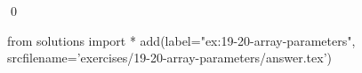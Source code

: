 
\begin{ex}
  \label{ex:19-20-array-parameters}
  
  \qed
\end{ex}
\begin{python0}
from solutions import *
add(label="ex:19-20-array-parameters",
    srcfilename='exercises/19-20-array-parameters/answer.tex')
\end{python0}
